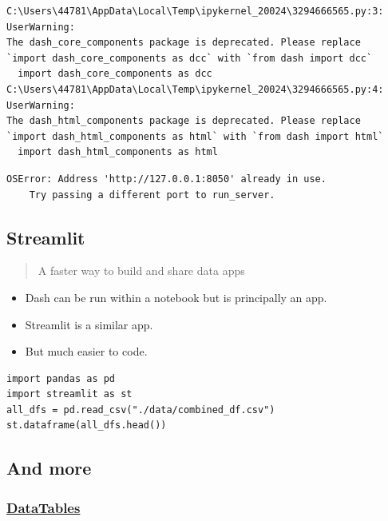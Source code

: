 \documentclass[
  letterpaper,
  DIV=11,
  numbers=noendperiod]{scrartcl}
\providecommand{\tightlist}{%
  \setlength{\itemsep}{0pt}\setlength{\parskip}{0pt}}\usepackage{longtable,booktabs,array}
\begin{document}
\begin{verbatim}
C:\Users\44781\AppData\Local\Temp\ipykernel_20024\3294666565.py:3: UserWarning: 
The dash_core_components package is deprecated. Please replace
`import dash_core_components as dcc` with `from dash import dcc`
  import dash_core_components as dcc
C:\Users\44781\AppData\Local\Temp\ipykernel_20024\3294666565.py:4: UserWarning: 
The dash_html_components package is deprecated. Please replace
`import dash_html_components as html` with `from dash import html`
  import dash_html_components as html
\end{verbatim}

\begin{verbatim}
OSError: Address 'http://127.0.0.1:8050' already in use.
    Try passing a different port to run_server.
\end{verbatim}

\hypertarget{streamlit-1}{%
\subsection{Streamlit}\label{streamlit-1}}

\begin{quote}
A faster way to build and share data apps
\end{quote}

\begin{itemize}
\tightlist
\item
  Dash can be run within a notebook but is principally an app.
\item
  Streamlit is a similar app.
\item
  But much easier to code.
\end{itemize}

\begin{verbatim}
import pandas as pd
import streamlit as st
all_dfs = pd.read_csv("./data/combined_df.csv")
st.dataframe(all_dfs.head())
\end{verbatim}

\hypertarget{and-more}{%
\subsection{And more}\label{and-more}}

\hypertarget{datatables}{%
\subsubsection{\texorpdfstring{\href{https://datatables.net/}{DataTables}}{DataTables}}\label{datatables}}
\end{document}
